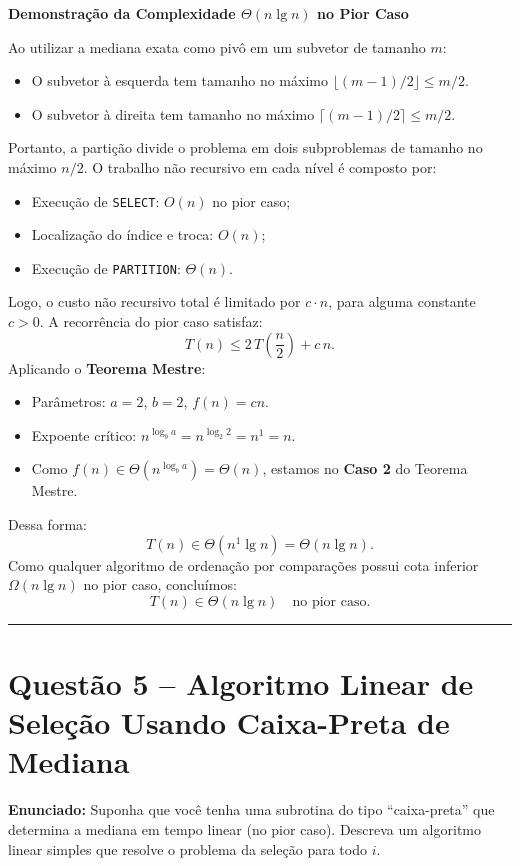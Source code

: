 \documentclass[11pt,a4paper]{article}
\newcommand{\res}[1]{\[\boxed{#1}\]}
\newcommand{\topico}[1]{\par\medskip\textbf{\color{azul}#1}\par}
\newcommand{\questao}[2]{\section*{Questão #1 -- #2}}
\begin{document}
\topico{Demonstração da Complexidade $\Theta(n \lg n)$ no Pior Caso}
Ao utilizar a mediana exata como pivô em um subvetor de tamanho $m$:
\begin{itemize}
    \item O subvetor à esquerda tem tamanho no máximo $\lfloor (m - 1)/2 \rfloor \le m/2$.
    \item O subvetor à direita tem tamanho no máximo $\lceil (m - 1)/2 \rceil \le m/2$.
\end{itemize}
Portanto, a partição divide o problema em dois subproblemas de tamanho no máximo $n/2$. 
O trabalho não recursivo em cada nível é composto por:
\begin{itemize}
    \item Execução de \texttt{SELECT}: $O(n)$ no pior caso;
    \item Localização do índice e troca: $O(n)$;
    \item Execução de \texttt{PARTITION}: $\Theta(n)$.
\end{itemize}
Logo, o custo não recursivo total é limitado por $c \cdot n$, para alguma constante $c > 0$. A recorrência do pior caso satisfaz:
\[
T(n) \le 2\,T\left(\frac{n}{2}\right) + c\,n.
\]
Aplicando o \textbf{Teorema Mestre}:
\begin{itemize}
    \item Parâmetros: $a = 2$, $b = 2$, $f(n) = c n$.
    \item Expoente crítico: $n^{\log_b a} = n^{\log_2 2} = n^1 = n$.
    \item Como $f(n) \in \Theta(n^{\log_b a}) = \Theta(n)$, estamos no \textbf{Caso 2} do Teorema Mestre.
\end{itemize}
Dessa forma:
\[
T(n) \in \Theta(n^1 \lg n) = \Theta(n \lg n).
\]
Como qualquer algoritmo de ordenação por comparações possui cota inferior $\Omega(n \lg n)$ no pior caso, concluímos:
\res{T(n) \in \Theta(n \lg n) \quad \text{no pior caso.}}

\vspace{12pt}
\hrule
\vspace{6pt}
\questao{5}{Algoritmo Linear de Seleção Usando Caixa-Preta de Mediana}

\textbf{Enunciado:} Suponha que você tenha uma subrotina do tipo ``caixa-preta'' que determina a mediana em tempo linear (no pior caso). Descreva um algoritmo linear simples que resolve o problema da seleção para todo $i$.
\end{document}
